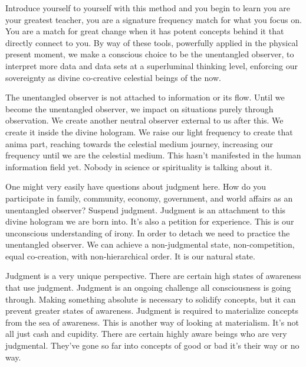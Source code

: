 \documentclass[letterpaper,11pt,twoside,titlepage,onecolumn,openany]{book}
\begin{document}
Introduce yourself to yourself with this method and you begin to learn
you are your greatest teacher, you are a signature frequency match for
what you focus on. You are a match for great change when it has potent
concepts behind it that directly connect to you. By way of these tools,
powerfully applied in the physical present moment, we make a conscious
choice to be the unentangled observer, to interpret more data and data
sets at a superluminal thinking level, enforcing our sovereignty as
divine co-creative celestial beings of the now.

The unentangled observer is not attached to information or its flow.
Until we become the unentangled observer, we impact on situations purely
through observation. We create another neutral observer external to us
after this. We create it inside the divine hologram. We raise our light
frequency to create that anima part, reaching towards the celestial
medium journey, increasing our frequency until we are the celestial
medium. This hasn't manifested in the human information field yet.
Nobody in science or spirituality is talking about it.

One might very easily have questions about judgment here. How do you
participate in family, community, economy, government, and world affairs
as an unentangled observer? Suspend judgment. Judgment is an attachment
to this divine hologram we are born into. It's also a petition for
experience. This is our unconscious understanding of irony. In order to
detach we need to practice the unentangled observer. We can achieve a
non-judgmental state, non-competition, equal co-creation, with
non-hierarchical order. It is our natural state.

Judgment is a very unique perspective. There are certain high states of
awareness that use judgment. Judgment is an ongoing challenge all
consciousness is going through. Making something absolute is necessary
to solidify concepts, but it can prevent greater states of awareness.
Judgment is required to materialize concepts from the sea of awareness.
This is another way of looking at materialism. It's not all just cash
and cupidity. There are certain highly aware beings who are very
judgmental. They've gone so far into concepts of good or bad it's their
way or no way.
\end{document}
